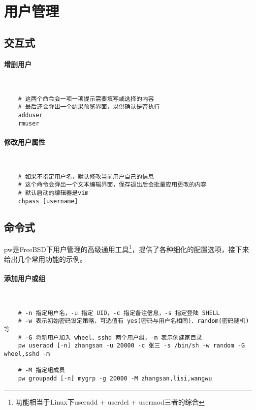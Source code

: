 \section{用户管理}

\subsection{交互式}

\paragraph{增删用户}~
\begin{lstlisting}
    # 这两个命令会一项一项提示需要填写或选择的内容
    # 最后还会弹出一个结果预览界面，以供确认是否执行
    adduser
    rmuser
\end{lstlisting}

\paragraph{修改用户属性}~

\begin{lstlisting}
    # 如果不指定用户名，默认修改当前用户自己的信息
    # 这个命令会弹出一个文本编辑界面，保存退出后会批量应用更改的内容
    # 默认启动的编辑器是vim
    chpass [username]
\end{lstlisting}

\subsection{命令式}

pw是FreeBSD下用户管理的高级通用工具\footnote{功能相当于Linux下useradd + userdel + usermod三者的综合}，提供了各种细化的配置选项，接下来给出几个常用功能的示例。

\paragraph{添加用户或组}~

\begin{lstlisting}
    # -n 指定用户名，-u 指定 UID，-c 指定备注信息，-s 指定登陆 SHELL
    # -w 表示初始密码设定策略，可选值有 yes(密码与用户名相同)、random(密码随机)等
    # -G 将新用户加入 wheel、sshd 两个用户组，-m 表示创建家目录
    pw useradd [-n] zhangsan -u 20000 -c 张三 -s /bin/sh -w random -G wheel,sshd -m

    # -M 指定组成员
    pw groupadd [-n] mygrp -g 20000 -M zhangsan,lisi,wangwu
\end{lstlisting}

